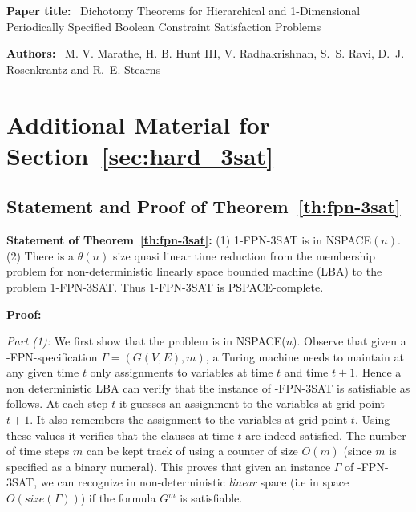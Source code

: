 
\appendix

\vspace*{2in}

\begin{center}
\end{center}

\bigskip\bigskip\bigskip


\noindent
\textbf{Paper title:}~ Dichotomy Theorems for Hierarchical and 1-Dimensional
Periodically Specified Boolean Constraint Satisfaction Problems

\bigskip

\noindent
\textbf{Authors:}~ M. V. Marathe, H. B. Hunt III, V. Radhakrishnan, S.~S. Ravi,
D.~J. Rosenkrantz and R.~E. Stearns

\clearpage

\section{Additional Material for Section~\ref{sec:hard_3sat}}
\label{sec:appA}

\subsection{Statement and Proof of Theorem~\ref{th:fpn-3sat}}

\noindent
\textbf{Statement of Theorem~\ref{th:fpn-3sat}:}
(1) 1-FPN-3SAT is in NSPACE$(n)$.~
(2) There is a $\theta(n)$ size 
quasi linear time reduction from the membership problem
for  non-deterministic linearly space bounded machine (LBA) 
to the problem 1-FPN-3SAT. 
Thus 1-FPN-3SAT is {\sf PSPACE}-complete. 

\medskip

\noindent
{\bf Proof:}  

\noindent
{\em Part (1):}
We first show that the problem is in {\sf NSPACE($n$)}.
Observe that given a {-FPN}-specification 
$\Gamma = (G(V,E), m)$, a Turing machine 
needs to maintain at any given time $t$ 
only assignments to variables at time $t$ and time $t+1$. 
Hence a non deterministic {\sf LBA}
can verify that the instance of {-FPN-3SAT} is satisfiable as follows. At 
each step $t$ it guesses an assignment to the variables at grid point $t+1$.
It also remembers the assignment to the variables at grid point $t$. Using
these values it verifies that the clauses at time $t$ are indeed satisfied.
The number of time steps  $m$ can be kept track of using a counter of size
$O(m)$ (since $m$ is specified as a binary numeral). 
This proves that given an instance $\Gamma$ 
of {-FPN-3SAT}, we can recognize in 
non-deterministic {\em linear } space (i.e in space $O(size(\Gamma))$) 
if the formula $G^m$ is satisfiable.

